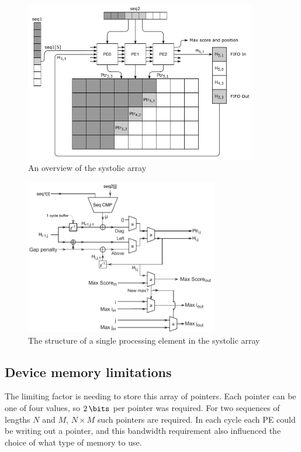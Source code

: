 \begin{figure}
    \centering
    \includegraphics[width=0.9\textwidth]{figs/med_systolic_array.pdf}
    \caption{An overview of the systolic array}
    \label{fig:Medium_Systolic_Array}
\end{figure}

\begin{figure}
    \centering
    \includegraphics[width=0.75\textwidth]{figs/pe_cell.pdf}
    \caption{The structure of a single processing element in the systolic array}
    \label{fig:PE_Cell}
\end{figure}

\subsection{Device memory limitations}
\label{sec:Memory_in_SV}

The limiting factor is needing to store this array of pointers.
Each pointer can be one of four values, so $\SI{2}{\bits}$ per pointer was required.
For two sequences of lengths $N$ and $M$, $N\times M$ such pointers are required.
In each cycle each PE could be writing out a pointer, and this bandwidth requirement also influenced the choice of what type of memory to use.

